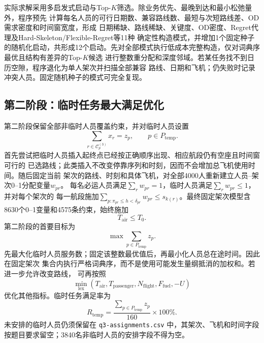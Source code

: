 \documentclass[UTF8,a4paper,zihao=5]{ctexart}
\begin{document}
实际求解采用多启发式启动与Top-$K$筛选。除业务优先、最晚到达和最小松弛量外，程序预先
计算每名人员的可行日期数、兼容路线数、最短与次短路线差、OD需求密度和时间窗宽度，形成
日期稀缺、路线稀缺、关键度、OD密度、Regret代理及Hard-Skeleton/Flexible-Regret等11种
确定性构造模式，并增加1个固定种子的随机化启动，共形成12个启动。先对全部模式执行低成本完整构造，仅对词典序最优且结构有差异的Top-$K$候选
进行整数重分配和深度邻域。若某任务找不到日历空隙，程序退化为单人架次并扫描全部兼容
路线、日期和飞机；仍失败时记录冲突人员。固定随机种子的模式可完全复现。
\subsection{第二阶段：临时任务最大满足优化}

第二阶段保留全部非临时人员覆盖约束，并对临时人员设置
\begin{equation}
  \sum_{r\in\mathcal{C}^{(3)}_p}x_r=z_p,
  \qquad p\in P_{\mathrm{temp}}.
  \label{eq:q3-temporary-cover}
\end{equation}
首先尝试把临时人员插入起终点已经按正确顺序出现、相应航段仍有空座且时间窗可行的
已选路线；此类插入不改变停靠序列和时刻，因而不会增加总飞机使用时间。随后固定当前
架次的路线、时刻和具体飞机，对全部4000人重新建立人员--架次0--1分配变量$w_{pr}$。
每名必运人员满足$\sum_r w_{pr}=1$，临时人员满足$\sum_r w_{pr}\le1$，并对每个架次的
每一航段施加$\sum_{p:\pi_{pr}\le h<\delta_{pr}}w_{pr}\le s_{k(r)}$。最终固定架次模型含
8630个0--1变量和4575条约束，始终施加
\begin{equation}
  T_{\mathrm{air}}\le T_0.
  \label{eq:q3-time-upper-bound}
\end{equation}
第二阶段的首要目标为
\begin{equation}
  \max \sum_{p\in P_{\mathrm{temp}}}z_p.
  \label{eq:q3-stage2-objective}
\end{equation}
先最大化临时人员服务数；固定该整数最优值后，再最小化人员总在途时间。因此在固定架次
集合内执行严格词典序，而不是使用可能发生量纲抵消的加权和。若进一步允许改变路线，
可再按照
\begin{equation}
  \min_{\mathrm{lex}}
  \left(
    T_{\mathrm{air}},
    T_{\mathrm{passenger}},
    N_{\mathrm{flight}},
    F_{\mathrm{fuel}},
    -U
  \right)
  \label{eq:q3-stage2-secondary}
\end{equation}
优化其他指标。临时任务满足率为
\begin{equation}
  R_{\mathrm{temp}}
  =\frac{\sum_{p\in P_{\mathrm{temp}}}z_p}{160}\times100\%.
  \label{eq:q3-temp-rate}
\end{equation}
未安排的临时人员仍须保留在 \texttt{q3-assignments.csv} 中，其架次、飞机和时间字段
按题目要求留空；3840名非临时人员的安排字段不得为空。
\end{document}
